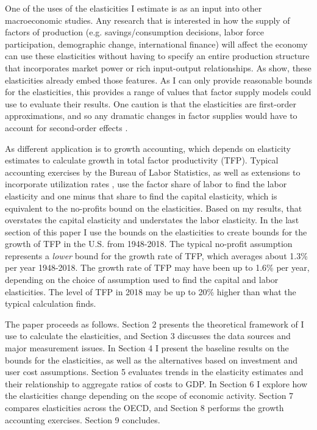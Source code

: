 \documentclass[11pt]{article}
\begin{document}
One of the uses of the elasticities I estimate is as an input into other macroeconomic studies. Any research that is interested in how the supply of factors of production (e.g. savings/consumption decisions, labor force participation, demographic change, international finance) will affect the economy can use these elasticities without having to specify an entire production structure that incorporates market power or rich input-output relationships. As \cite{bfshortnote,bfprodge} show, these elasticities already embed those features. As I can only provide reasonable bounds for the elasticities, this provides a range of values that factor supply models could use to evaluate their results. One caution is that the elasticities are first-order approximations, and so any dramatic changes in factor supplies would have to account for second-order effects \citep{bfmicro}. 

As different application is to growth accounting, which depends on elasticity estimates to calculate growth in total factor productivity (TFP). Typical accounting exercises by the Bureau of Labor Statistics, as well as extensions to incorporate utilization rates \citep{kfb2006,fernald2014}, use the factor share of labor to find the labor elasticity and one minus that share to find the capital elasticity, which is equivalent to the no-profits bound on the elasticities. Based on my results, that overstates the capital elasticity and understates the labor elasticity. In the last section of this paper I use the bounds on the elasticities to create bounds for the growth of TFP in the U.S. from 1948-2018. The typical no-profit assumption represents a \textit{lower} bound for the growth rate of TFP, which averages about 1.3\% per year 1948-2018. The growth rate of TFP may have been up to 1.6\% per year, depending on the choice of assumption used to find the capital and labor elasticities. The level of TFP in 2018 may be up to 20\% higher than what the typical calculation finds. 

The paper proceeds as follows. Section 2 presents the theoretical framework of \cite{bfshortnote,bfprodge} I use to calculate the elasticities, and Section 3 discusses the data sources and major measurement issues. In Section 4 I present the baseline results on the bounds for the elasticities, as well as the alternatives based on investment and user cost assumptions. Section 5 evaluates trends in the elasticity estimates and their relationship to aggregate ratios of costs to GDP. In Section 6 I explore how the elasticities change depending on the scope of economic activity. Section 7 compares elasticities across the OECD, and Section 8 performs the growth accounting exercises. Section 9 concludes.
\end{document}
